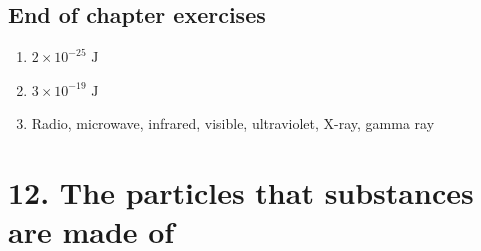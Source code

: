 \subsection{End of chapter exercises} 
\begin{multicols}{3}
\begin{enumerate}[itemsep=20pt, label=\textbf{\arabic*}.]
\item $2 \times 10^{-25} \text{ J}$
\item $3 \times 10^{-19} \text{ J}$
\item Radio, microwave, infrared, visible, ultraviolet, X-ray, gamma ray
\end{enumerate}
\end{multicols}

\section {12. The particles that substances are made of}
